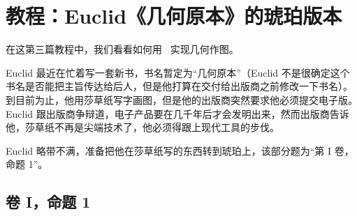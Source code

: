 %
%
%


\section{教程：Euclid《几何原本》的琥珀版本}

\bohs

在这第三篇教程中，我们看看如何用 \tikzname\ 实现几何作图。

Euclid 最近在忙着写一套新书，书名暂定为“几何原本”（Euclid 不是很确定这个书名是否能把主旨传达给后人，但是他打算在交付给出版商之前修改一下书名）。
到目前为止，他用莎草纸写字画图，但是他的出版商突然要求他必须提交电子版。
Euclid 跟出版商争辩道，电子产品要在几千年后才会发明出来，然而出版商告诉他，莎草纸不再是尖端技术了，他必须得跟上现代工具的步伐。

Euclid 略带不满，准备把他在莎草纸写的东西转到琥珀上，该部分题为“第 I 卷，命题 1”。

\eohs

\subsection{卷 I，命题 1}

